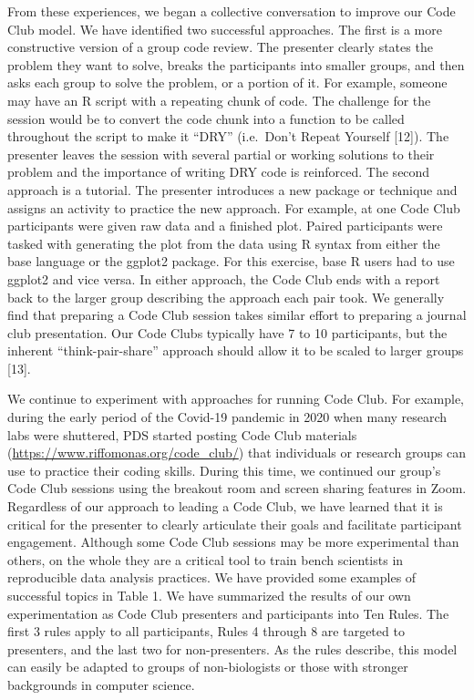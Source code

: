 \documentclass[
  11pt,
]{article}
\begin{document}
From these experiences, we began a collective conversation to improve
our Code Club model. We have identified two successful approaches. The
first is a more constructive version of a group code review. The
presenter clearly states the problem they want to solve, breaks the
participants into smaller groups, and then asks each group to solve the
problem, or a portion of it. For example, someone may have an R script
with a repeating chunk of code. The challenge for the session would be
to convert the code chunk into a function to be called throughout the
script to make it ``DRY'' (i.e.~Don't Repeat Yourself {[}12{]}). The
presenter leaves the session with several partial or working solutions
to their problem and the importance of writing DRY code is reinforced.
The second approach is a tutorial. The presenter introduces a new
package or technique and assigns an activity to practice the new
approach. For example, at one Code Club participants were given raw data
and a finished plot. Paired participants were tasked with generating the
plot from the data using R syntax from either the base language or the
ggplot2 package. For this exercise, base R users had to use ggplot2 and
vice versa. In either approach, the Code Club ends with a report back to
the larger group describing the approach each pair took. We generally
find that preparing a Code Club session takes similar effort to
preparing a journal club presentation. Our Code Clubs typically have 7
to 10 participants, but the inherent ``think-pair-share'' approach
should allow it to be scaled to larger groups {[}13{]}.

We continue to experiment with approaches for running Code Club. For
example, during the early period of the Covid-19 pandemic in 2020 when
many research labs were shuttered, PDS started posting Code Club
materials (\url{https://www.riffomonas.org/code_club/}) that individuals
or research groups can use to practice their coding skills. During this
time, we continued our group's Code Club sessions using the breakout
room and screen sharing features in Zoom. Regardless of our approach to
leading a Code Club, we have learned that it is critical for the
presenter to clearly articulate their goals and facilitate participant
engagement. Although some Code Club sessions may be more experimental
than others, on the whole they are a critical tool to train bench
scientists in reproducible data analysis practices. We have provided
some examples of successful topics in Table 1. We have summarized the
results of our own experimentation as Code Club presenters and
participants into Ten Rules. The first 3 rules apply to all
participants, Rules 4 through 8 are targeted to presenters, and the last
two for non-presenters. As the rules describe, this model can easily be
adapted to groups of non-biologists or those with stronger backgrounds
in computer science.
\end{document}

